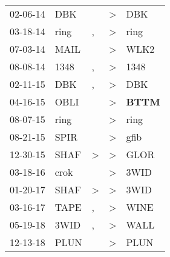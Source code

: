 \begin{supertabular}{p{0.07\textwidth}p{0.06\textwidth}p{0.02\textwidth}p{0.02\textwidth}p{0.06\textwidth}}
          02-06-14\textsuperscript{} &            DBK\textsuperscript{} &                  &     \textgreater &            DBK\textsuperscript{} \\
          03-18-14\textsuperscript{} &           ring\textsuperscript{} &                , &     \textgreater &           ring\textsuperscript{} \\
          07-03-14\textsuperscript{} &           MAIL\textsuperscript{} &                  &     \textgreater &           WLK2\textsuperscript{} \\
          08-08-14\textsuperscript{} &           1348\textsuperscript{} &                , &     \textgreater &           1348\textsuperscript{} \\
          02-11-15\textsuperscript{} &            DBK\textsuperscript{} &                , &     \textgreater &            DBK\textsuperscript{} \\
          04-16-15\textsuperscript{} &           OBLI\textsuperscript{} &                  &     \textgreater &  \textbf{BTTM\textsuperscript{}} \\
          08-07-15\textsuperscript{} &           ring\textsuperscript{} &                  &     \textgreater &           ring\textsuperscript{} \\
          08-21-15\textsuperscript{} &           SPIR\textsuperscript{} &                  &     \textgreater &           gfib\textsuperscript{} \\
          12-30-15\textsuperscript{} &           SHAF\textsuperscript{} &     \textgreater &     \textgreater &           GLOR\textsuperscript{} \\
          03-18-16\textsuperscript{} &           crok\textsuperscript{} &                  &     \textgreater &           3WID\textsuperscript{} \\
          01-20-17\textsuperscript{} &           SHAF\textsuperscript{} &     \textgreater &     \textgreater &           3WID\textsuperscript{} \\
          03-16-17\textsuperscript{} &           TAPE\textsuperscript{} &                , &     \textgreater &           WINE\textsuperscript{} \\
          05-19-18\textsuperscript{} &           3WID\textsuperscript{} &                , &     \textgreater &           WALL\textsuperscript{} \\
          12-13-18\textsuperscript{} &           PLUN\textsuperscript{} &                  &     \textgreater &           PLUN\textsuperscript{} \\

\end{supertabular}

